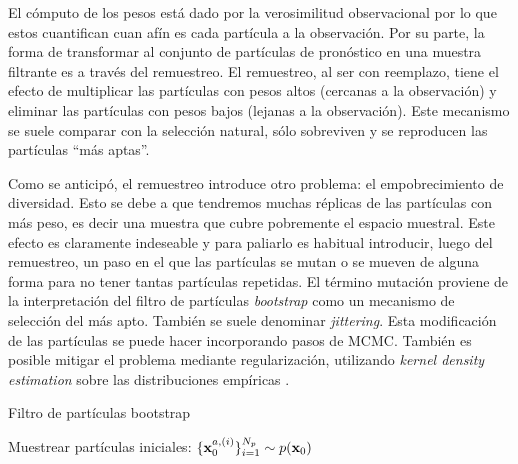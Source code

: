 El cómputo de los pesos está dado por la verosimilitud observacional por lo que estos cuantifican cuan afín es cada partícula a la observación. Por su parte, la forma de transformar al conjunto de partículas de pronóstico en una muestra filtrante es a través del remuestreo. El remuestreo, al ser con reemplazo, tiene el efecto de multiplicar las partículas con pesos altos (cercanas a la observación) y eliminar las partículas con pesos bajos (lejanas a la observación). Este mecanismo se suele comparar con la selección natural, sólo sobreviven y se reproducen las partículas ``más aptas''.

Como se anticipó, el remuestreo introduce otro problema: el empobrecimiento de diversidad. Esto se debe a que tendremos muchas réplicas de las partículas con más peso, es decir una muestra que cubre pobremente el espacio muestral. Este efecto es claramente indeseable y para paliarlo es habitual introducir, luego del remuestreo, un paso en el que las partículas se mutan o se mueven de alguna forma para no tener tantas partículas repetidas. El término mutación proviene de la interpretación del filtro de partículas \textit{bootstrap} como un mecanismo de selección del más apto. También se suele denominar \textit{jittering}. Esta modificación de las partículas se puede hacer incorporando pasos de MCMC. También es posible mitigar el problema mediante regularización, utilizando \textit{kernel density estimation} sobre las distribuciones empíricas \citep{Sarkka2013, Arulampalam2002, Ruchi2019}.

\begin{algorithm}[h]
\caption{Filtro de partículas bootstrap}
\label{algo:bootstrap_pf}
    Muestrear partículas iniciales: $\{\mathbf{x}_0^{a, (i)}\}_{i=1}^{N_p} \sim p(\mathbf{x}_0)$
    
\end{algorithm}

